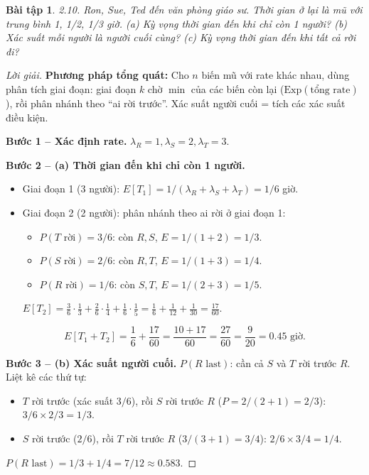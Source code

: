 \documentclass[8pt,a4paper]{article}
\newtheorem{exercise}{Bài tập}
\newenvironment{solution}{\begin{proof}[Lời giải]}{\end{proof}}
\begin{document}
\begin{exercise}
2.10. Ron, Sue, Ted đến văn phòng giáo sư. Thời gian ở lại là mũ với trung bình 1, 1/2, 1/3 giờ.
(a) Kỳ vọng thời gian đến khi chỉ còn 1 người?
(b) Xác suất mỗi người là người cuối cùng?
(c) Kỳ vọng thời gian đến khi tất cả rời đi?
\end{exercise}
\begin{solution}
\textbf{Phương pháp tổng quát:} Cho $n$ biến mũ với rate khác nhau, dùng phân tích giai đoạn: giai đoạn $k$ chờ $\min$ của các biến còn lại ($\text{Exp}(\text{tổng rate})$), rồi phân nhánh theo ``ai rời trước''. Xác suất người cuối = tích các xác suất điều kiện.

\textbf{Bước 1 -- Xác định rate.} $\lambda_R = 1, \lambda_S = 2, \lambda_T = 3$.

\textbf{Bước 2 -- (a) Thời gian đến khi chỉ còn 1 người.}
\begin{itemize}[nosep]
  \item Giai đoạn 1 (3 người): $E[T_1] = 1/(\lambda_R + \lambda_S + \lambda_T) = 1/6$ giờ.
  \item Giai đoạn 2 (2 người): phân nhánh theo ai rời ở giai đoạn 1:
  \begin{itemize}[nosep]
    \item $P(T \text{ rời}) = 3/6$: còn $R, S$, $E = 1/(1+2) = 1/3$.
    \item $P(S \text{ rời}) = 2/6$: còn $R, T$, $E = 1/(1+3) = 1/4$.
    \item $P(R \text{ rời}) = 1/6$: còn $S, T$, $E = 1/(2+3) = 1/5$.
  \end{itemize}
  $E[T_2] = \frac{3}{6} \cdot \frac{1}{3} + \frac{2}{6} \cdot \frac{1}{4} + \frac{1}{6} \cdot \frac{1}{5} = \frac{1}{6} + \frac{1}{12} + \frac{1}{30} = \frac{17}{60}$.
\end{itemize}
\[
  E[T_1 + T_2] = \frac{1}{6} + \frac{17}{60} = \frac{10 + 17}{60} = \boxed{\frac{27}{60} = \frac{9}{20} = 0.45 \text{ giờ}}.
\]

\textbf{Bước 3 -- (b) Xác suất người cuối.} $P(R \text{ last})$: cần cả $S$ và $T$ rời trước $R$. Liệt kê các thứ tự:
\begin{itemize}[nosep]
  \item $T$ rời trước (xác suất $3/6$), rồi $S$ rời trước $R$ ($P = 2/(2+1) = 2/3$): $3/6 \times 2/3 = 1/3$.
  \item $S$ rời trước ($2/6$), rồi $T$ rời trước $R$ ($3/(3+1) = 3/4$): $2/6 \times 3/4 = 1/4$.
\end{itemize}
$P(R \text{ last}) = 1/3 + 1/4 = \boxed{7/12 \approx 0.583}$.


\end{solution}
\end{document}
